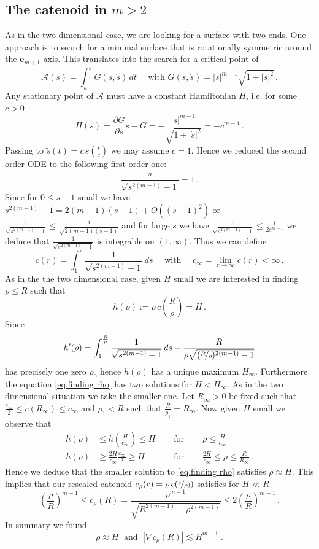 \documentclass[reqno]{amsart}
\theoremstyle{definition}
\theoremstyle{remark}
\numberwithin{equation}{section}
\begin{document}
\subsection{The catenoid in $m> 2$}\label{subsec.catenoid m>2}
As in the two-dimensional case, we are looking for a surface with two ends. One approach is to search for a minimal surface that is rotationally symmetric around the $\boldsymbol{e}_{m+1}$-axis. This translates into the search for a critical point of 
\[\mathcal{A}(s)=\int_{a}^b G(s,\dot{s})\, dt \quad\text{ with } G(s,\dot{s})=|s|^{m-1}\sqrt{1+|\dot{s}|^2}\,.\]
Any stationary point of $\mathcal{A}$ must have a constant Hamiltonian $H$, i.e. for some $c>0$
\[H(s)=\frac{\partial{G}}{\partial \dot{s}}\dot{s}-G= -\frac{|s|^{m-1}}{\sqrt{1+|\dot{s}|^2}}=-c^{m-1}\,.\]
Passing to $\tilde{s}(t)=c \,s(\frac{t}{c})$ we may assume $c=1$.
Hence we reduced the second order ODE to the following first order one:
\[ \frac{\dot{s}}{\sqrt{s^{2(m-1)}-1}}=1\,.\]
Since for $0\le s-1$ small we have $s^{2(m-1)}-1 = 2(m-1)(s-1) + O((s-1)^2)$ or $\frac{1}{\sqrt{s^{2(m-1)}-1}}\le \frac{2}{\sqrt{2(m-1)(s-1)}}$ and for large $s$ we have $\frac{1}{\sqrt{s^{2(m-1)}-1}}\le\frac{1}{2s^{m-1}}$ we deduce that $\frac{1}{\sqrt{s^{2(m-1)}-1}}$ is integrable on $(1,\infty)$. Thus we can define 
\[c(r)=\int_{1}^r \frac{1}{\sqrt{s^{2(m-1)}-1}}\, ds \quad\text{ with }\quad c_\infty = \lim_{r\to \infty} c(r)<\infty\,.\]
As in the the two dimensional case, given $H$ small we are interested in finding $\rho\le R$ such that 
\begin{equation}\label{eq.finding rho}
    h(\rho):=\rho \,c\left(\frac{R}{\rho}\right)=H\,.
\end{equation}
Since 
\[h'(\rho) = \int_{1}^{\frac{R}{\rho}} \frac{1}{\sqrt{s^{2(m-1)}-1}}\, ds - \frac{R}{\rho\sqrt{(\nicefrac{R}{\rho})^{2(m-1)}-1}}\]
has precisely one zero $\rho_0$ hence $h(\rho)$ has a unique maximum $H_\infty$. Furthermore the equation \eqref{eq.finding rho} has two solutions for $H<H_\infty$. As in the two dimensional situation we take the smaller one. 
Let $R_\infty>0$ be fixed such that $\frac{c_\infty}{2} \le c(R_\infty) \le c_\infty$ and $\rho_1<R$ such that $\frac{R}{\rho_1}=R_\infty$. Now given $H$ small we observe that
\begin{align*}
    h(\rho) &\le h\left(\frac{H}{c_\infty}\right) \le H \quad&\text{ for }& \quad \rho \le \frac{H}{c_\infty}\\
    h(\rho) &\ge \frac{2H}{c_\infty} \frac{c_\infty}{2} \ge H \quad&\text{ for }& \quad \frac{2H}{c_\infty} \le \rho \le \frac{R}{R_\infty}\,.
\end{align*}
Hence we deduce that the smaller solution to \eqref{eq.finding rho} satisfies $\rho \approx H$. This implies that our rescaled catenoid $c_\rho(r)=\rho \, c(\nicefrac{r}{\rho)})$ satisfies for $H \ll R$ 
\[\left(\frac{\rho}{R}\right)^{m-1} \le \dot{c}_\rho(R)=\frac{\rho^{m-1}}{\sqrt{R^{2(m-1)}-\rho^{2(m-1)}}} \le 2  \left(\frac{\rho}{R}\right)^{m-1}\,.\]
In summary we found
\begin{equation}\label{eq.estimates for catenoid in m>2}
    \rho \approx H \;\text{ and }\; |\nabla c_\rho(R)| \lesssim H^{m-1}\;.
\end{equation}
\end{document}
